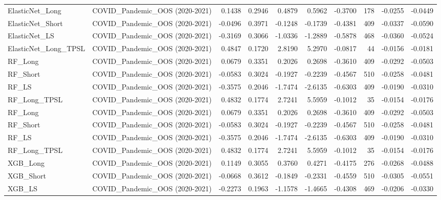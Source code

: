 \begin{tabular}{llrrrrrrrr}
\cline{1-10}
ElasticNet\_Long & COVID\_Pandemic\_OOS (2020-2021) & 0.1438 & 0.2946 & 0.4879 & 0.5962 & -0.3700 & 178 & -0.0255 & -0.0449 \\
\cline{1-10}
ElasticNet\_Short & COVID\_Pandemic\_OOS (2020-2021) & -0.0496 & 0.3971 & -0.1248 & -0.1739 & -0.4381 & 409 & -0.0337 & -0.0590 \\
\cline{1-10}
ElasticNet\_LS & COVID\_Pandemic\_OOS (2020-2021) & -0.3169 & 0.3066 & -1.0336 & -1.2889 & -0.5878 & 468 & -0.0360 & -0.0524 \\
\cline{1-10}
ElasticNet\_Long\_TPSL & COVID\_Pandemic\_OOS (2020-2021) & 0.4847 & 0.1720 & 2.8190 & 5.2970 & -0.0817 & 44 & -0.0156 & -0.0181 \\
\cline{1-10}
RF\_Long & COVID\_Pandemic\_OOS (2020-2021) & 0.0679 & 0.3351 & 0.2026 & 0.2698 & -0.3610 & 409 & -0.0292 & -0.0503 \\
\cline{1-10}
RF\_Short & COVID\_Pandemic\_OOS (2020-2021) & -0.0583 & 0.3024 & -0.1927 & -0.2239 & -0.4567 & 510 & -0.0258 & -0.0481 \\
\cline{1-10}
RF\_LS & COVID\_Pandemic\_OOS (2020-2021) & -0.3575 & 0.2046 & -1.7474 & -2.6135 & -0.6303 & 409 & -0.0190 & -0.0310 \\
\cline{1-10}
RF\_Long\_TPSL & COVID\_Pandemic\_OOS (2020-2021) & 0.4832 & 0.1774 & 2.7241 & 5.5959 & -0.1012 & 35 & -0.0154 & -0.0176 \\
\cline{1-10}
RF\_Long & COVID\_Pandemic\_OOS (2020-2021) & 0.0679 & 0.3351 & 0.2026 & 0.2698 & -0.3610 & 409 & -0.0292 & -0.0503 \\
\cline{1-10}
RF\_Short & COVID\_Pandemic\_OOS (2020-2021) & -0.0583 & 0.3024 & -0.1927 & -0.2239 & -0.4567 & 510 & -0.0258 & -0.0481 \\
\cline{1-10}
RF\_LS & COVID\_Pandemic\_OOS (2020-2021) & -0.3575 & 0.2046 & -1.7474 & -2.6135 & -0.6303 & 409 & -0.0190 & -0.0310 \\
\cline{1-10}
RF\_Long\_TPSL & COVID\_Pandemic\_OOS (2020-2021) & 0.4832 & 0.1774 & 2.7241 & 5.5959 & -0.1012 & 35 & -0.0154 & -0.0176 \\
\cline{1-10}
XGB\_Long & COVID\_Pandemic\_OOS (2020-2021) & 0.1149 & 0.3055 & 0.3760 & 0.4271 & -0.4175 & 276 & -0.0268 & -0.0488 \\
\cline{1-10}
XGB\_Short & COVID\_Pandemic\_OOS (2020-2021) & -0.0668 & 0.3612 & -0.1849 & -0.2331 & -0.4559 & 510 & -0.0305 & -0.0551 \\
\cline{1-10}
XGB\_LS & COVID\_Pandemic\_OOS (2020-2021) & -0.2273 & 0.1963 & -1.1578 & -1.4665 & -0.4308 & 469 & -0.0206 & -0.0330 \\

\end{tabular}

